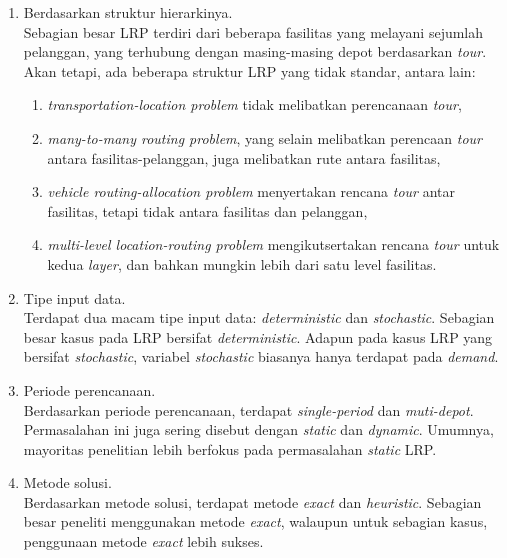 \begin{enumerate}
\item Berdasarkan struktur hierarkinya.\\
	Sebagian besar LRP terdiri dari beberapa fasilitas yang melayani sejumlah pelanggan, yang terhubung dengan masing-masing depot berdasarkan \textit{tour}. Akan tetapi, ada beberapa struktur LRP yang tidak standar, antara lain: 
	\begin{enumerate}
	\item \textit{transportation-location problem} tidak melibatkan perencanaan \textit{tour}, 
	\item \textit{many-to-many routing problem}, yang selain melibatkan perencaan \textit{tour} antara fasilitas-pelanggan, juga melibatkan rute antara fasilitas, 
	\item \textit{vehicle routing-allocation problem} menyertakan rencana \textit{tour} antar fasilitas, tetapi tidak antara fasilitas dan pelanggan, 
	\item \textit{multi-level location-routing problem} mengikutsertakan rencana \textit{tour} untuk kedua \textit{layer}, dan bahkan mungkin lebih dari satu level fasilitas.
	\end{enumerate}
\item Tipe input data. \\
	Terdapat dua macam tipe input data: \textit{deterministic} dan \textit{stochastic}. Sebagian besar kasus pada LRP bersifat \textit{deterministic}. Adapun pada kasus LRP yang bersifat \textit{stochastic}, variabel \textit{stochastic} biasanya hanya terdapat pada \textit{demand}.
\item Periode perencanaan. \\
	Berdasarkan periode perencanaan, terdapat \textit{single-period} dan \textit{muti-depot}. Permasalahan ini juga sering disebut dengan \textit{static} dan \textit{dynamic}. Umumnya, mayoritas penelitian lebih berfokus pada permasalahan \textit{static} LRP.
\item Metode solusi. \\
	Berdasarkan metode solusi, terdapat metode \textit{exact} dan \textit{heuristic}. Sebagian besar peneliti menggunakan metode \textit{exact}, walaupun untuk sebagian kasus, penggunaan metode \textit{exact} lebih sukses.
\end{enumerate}


